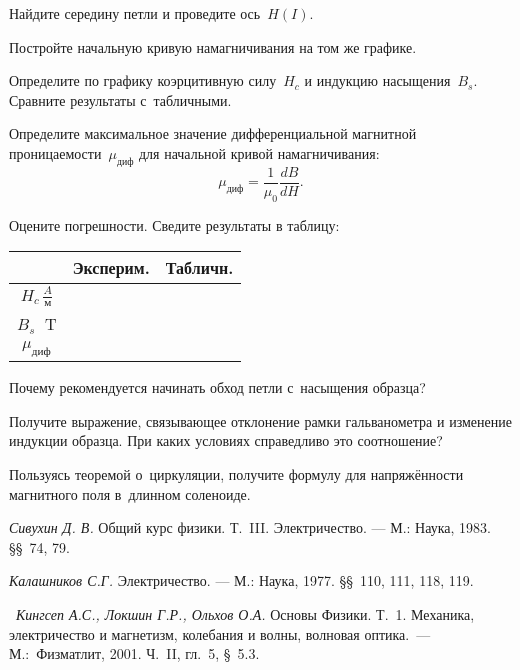 Найдите середину петли и проведите ось~$H(I)$.

\n Постройте начальную кривую намагничивания на том же графике.

\n Определите по графику коэрцитивную силу~$H_c$ и индукцию насыщения~$B_s$. Сравните результаты с~табличными.

\n Определите максимальное значение дифференциальной магнитной проницаемости~$\mu_{диф}$ для начальной кривой
намагничивания:
\[
\mu_{диф}=\frac{1}{\mu_0}\frac{dB}{dH}.
\]

\n Оцените погрешности. Сведите результаты в таблицу:

\begin{center}
\begin{tabular}{|c|c|c|}
\hline
&Эксперим.&Табличн.\\
\hline\hline
$H_c\,\frac{A}{м}$& & \\
$B_s\;$ T & & \\
$\mu_{диф}$ & & \\
\hline
\end{tabular}
\end{center}

{\small

\kv

\n Почему рекомендуется начинать обход петли с~насыщения образца?

\n Получите выражение, связывающее отклонение рамки гальванометра и изменение индукции образца. При каких условиях
справедливо это соотношение?

\n Пользуясь теоремой о~циркуляции, получите формулу для напряжённости магнитного поля в~длинном соленоиде.

\lit

\n \emph{Сивухин Д. В.} Общий курс физики. Т.~III. Электричество. --- М.: Наука, 1983. \S\S~74, 79.

\n \emph{Калашников С.Г.} Электричество. --- М.: Наука, 1977. \S\S~110, 111, 118, 119.

\n~\emph{Кингсеп А.С., Локшин Г.Р., Ольхов О.А.} Основы Физики. Т.~1. Механика, электричество и магнетизм, колебания и
волны, волновая оптика.~--- М.:~Физматлит, 2001. Ч.~II, гл.~5, \S~5.3.

}
